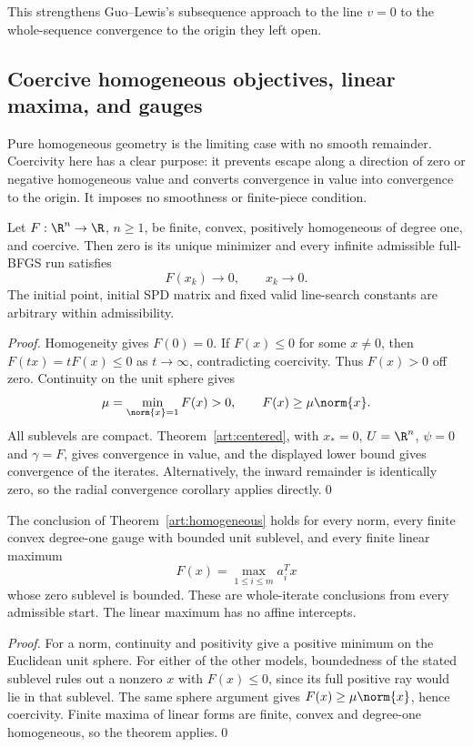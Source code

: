 This strengthens Guo--Lewis's subsequence approach to the line $v=0$
\cite[Corollary~4.4]{GL18} to the whole-sequence convergence to the origin
they left open.

\subsection{Coercive homogeneous objectives, linear maxima, and gauges}

Pure homogeneous geometry is the limiting case with no smooth remainder.
Coercivity here has a clear purpose: it prevents escape along a direction of
zero or negative homogeneous value and converts convergence in value into
convergence to the origin. It imposes no smoothness or finite-piece condition.

\begin{theorem}\label{art:homogeneous}
Let $F:\R^n\to\R$, $n\ge1$, be finite, convex, positively homogeneous of
degree one, and coercive. Then zero is its unique minimizer and every
infinite admissible full-BFGS run satisfies
\[
 F(x_k)\longrightarrow0,\qquad x_k\longrightarrow0.
\]
The initial point, initial SPD matrix and fixed valid line-search constants
are arbitrary within admissibility.
\end{theorem}
\begin{proof}
Homogeneity gives $F(0)=0$. If $F(x)\le0$ for some $x\ne0$, then
$F(tx)=tF(x)\le0$ as $t\to\infty$, contradicting coercivity. Thus
$F(x)>0$ off zero. Continuity on the unit sphere gives
\[
 \mu=\min_{\norm{x}=1}F(x)>0,
 \qquad F(x)\ge\mu\norm{x}.
\]
All sublevels are compact. Theorem~\ref{art:centered}, with $x_*=0$, $U=\R^n$, $\psi=0$ and
$\gamma=F$, gives convergence in value, and the displayed lower bound gives
convergence of the iterates. Alternatively, the inward remainder is identically
zero, so the radial convergence corollary applies directly.\qed
\end{proof}

\begin{corollary}\label{art:homogeneous-examples}
The conclusion of Theorem~\ref{art:homogeneous} holds for every norm, every
finite convex degree-one gauge with bounded unit sublevel, and every finite
linear maximum
\[
 F(x)=\max_{1\le i\le m}a_i^Tx
\]
whose zero sublevel is bounded. These are whole-iterate conclusions from every
admissible start. The linear maximum has no affine intercepts.
\end{corollary}
\begin{proof}
For a norm, continuity and positivity give a positive minimum on the Euclidean
unit sphere. For either of the other models, boundedness of the stated
sublevel rules out a nonzero $x$ with $F(x)\le0$, since its full positive ray
would lie in that sublevel. The same sphere argument gives
$F(x)\ge\mu\norm{x}$, hence coercivity. Finite maxima of linear forms are
finite, convex and degree-one homogeneous, so the theorem applies.\qed
\end{proof}

